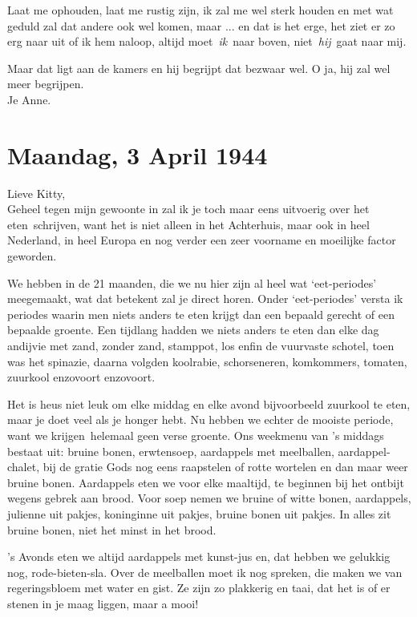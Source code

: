 \documentclass{book}
\begin{document}
Laat me ophouden, laat me rustig zijn, ik zal me wel sterk houden en met wat
geduld zal dat andere ook wel komen, maar ... en dat is het erge, het ziet er zo
erg naar uit of ik hem naloop, altijd moet~\emph{ik}~naar boven,
niet~\emph{hij}~gaat naar mij.

Maar dat ligt aan de kamers en hij begrijpt dat bezwaar wel. O ja, hij zal wel
meer begrijpen.\\
Je Anne.

\section*{Maandag, 3 April 1944}

Lieve Kitty,\\
Geheel tegen mijn gewoonte in zal ik je toch maar eens uitvoerig
over het eten~schrijven, want het is niet alleen in het Achterhuis, maar ook in
heel Nederland, in heel Europa en nog verder een zeer voorname en moeilijke
factor geworden.

We hebben in de 21 maanden, die we nu hier zijn al heel wat `eet-periodes'
meegemaakt, wat dat betekent zal je direct horen. Onder `eet-periodes' versta ik
periodes waarin men niets anders te eten krijgt dan een bepaald gerecht of een
bepaalde groente. Een tijdlang hadden we niets anders te eten dan elke dag
andijvie met zand, zonder zand, stamppot, los enfin de vuurvaste schotel, toen
was het spinazie, daarna volgden koolrabie, schorseneren, komkommers, tomaten,
zuurkool enzovoort enzovoort.

Het is heus niet leuk om elke middag en elke avond bijvoorbeeld zuurkool te
eten, maar je doet veel als je honger hebt. Nu hebben we echter de mooiste
periode, want we krijgen~helemaal geen verse groente. Ons weekmenu van 's
middags bestaat uit: bruine bonen, erwtensoep, aardappels met meelballen,
aardappel-chalet, bij de gratie Gods nog eens raapstelen of rotte wortelen en
dan maar weer bruine bonen. Aardappels eten we voor elke maaltijd, te beginnen
bij het ontbijt wegens gebrek aan brood. Voor soep nemen we bruine of witte
bonen, aardappels, julienne uit pakjes, koninginne uit pakjes, bruine bonen uit
pakjes. In alles zit bruine bonen, niet het minst in het brood.

's Avonds eten we altijd aardappels met kunst-jus en, dat hebben we gelukkig
nog, rode-bieten-sla. Over de meelballen moet ik nog spreken, die maken we van
regeringsbloem met water en gist. Ze zijn zo plakkerig en taai, dat het is of er
stenen in je maag liggen, maar a mooi!
\end{document}
